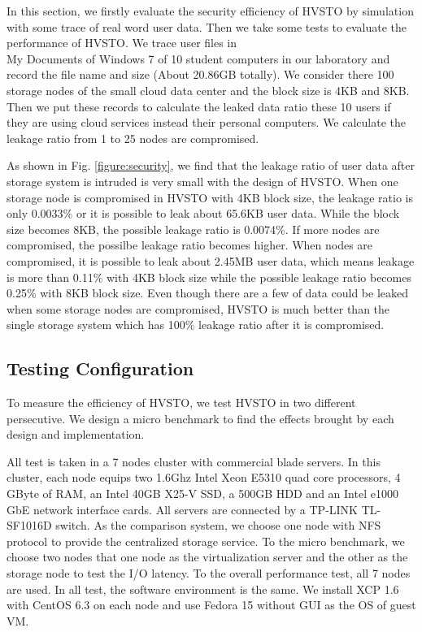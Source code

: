 \documentclass[conference]{IEEEtran}
\begin{document}
In this section, we firstly evaluate the security efficiency of HVSTO by simulation with some trace of real word user data. Then we take some tests to evaluate the performance of HVSTO. We trace user files in \\My Documents of Windows 7 of 10 student computers in our laboratory and record the file name and size (About 20.86GB totally). We consider there 100 storage nodes of the small cloud data center and the block size is 4KB and 8KB. Then we put these records to calculate the leaked data ratio these 10 users if they are using cloud services instead their personal computers. We calculate the leakage ratio from 1 to 25 nodes are compromised. 

As shown in Fig. \ref{figure:security}, we find that the leakage ratio of user data after storage system is intruded is very small with the design of HVSTO. When one storage node is compromised in HVSTO with 4KB block size, the leakage ratio is only 0.0033\% or it is possible to leak about 65.6KB user data. While the block size becomes 8KB, the possible leakage ratio is 0.0074\%. If more nodes are compromised, the possilbe leakage ratio becomes higher. When  nodes are compromised, it is possible to leak about 
2.45MB user data, which means leakage is more than 0.11\% with 4KB block size while the possible leakage ratio becomes 0.25\% with 8KB block size. Even though there are a few of data could be leaked when some storage nodes are compromised, HVSTO is much better than the single storage system which has 100\% leakage ratio after it is compromised.

\subsection{Testing Configuration}
To measure the efficiency of HVSTO, we test HVSTO in two different persecutive. We design a micro benchmark to find the effects brought by each design and implementation.

All test is taken in a 7 nodes cluster with commercial blade servers. In this cluster,  each node equips two 1.6Ghz Intel Xeon E5310 quad core processors, 4 GByte of  RAM, an Intel 40GB X25-V SSD, a 500GB HDD and an Intel e1000 GbE network interface cards. All servers are connected by a TP-LINK TL-SF1016D switch. As the comparison system, we choose one node with NFS protocol \cite{Callaghan1995} to provide the centralized storage service. To the micro benchmark, we choose two nodes that one node as the virtualization server and the other as the storage node to test the I/O latency. To the overall performance test, all 7 nodes are used. In all test, the software environment is the same. We install XCP 1.6 with CentOS 6.3 on each node and use Fedora 15 without GUI as the OS of guest VM.
\end{document}
